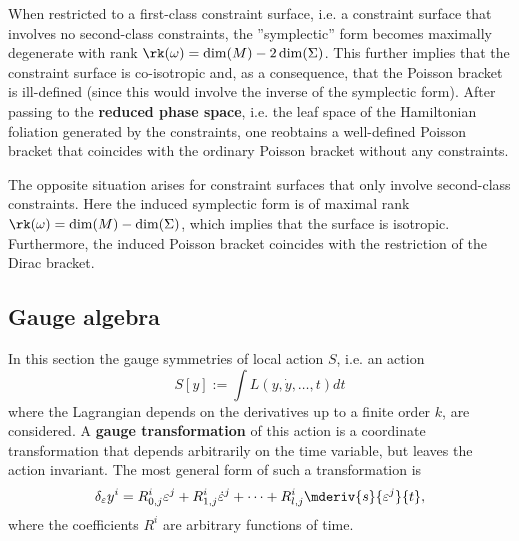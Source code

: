 
    \begin{property}
        When restricted to a first-class constraint surface, i.e. a constraint surface that involves no second-class constraints, the ''symplectic'' form becomes maximally degenerate with rank $\rk(\omega) = \dim(M) - 2\dim(\Sigma)$. This further implies that the constraint surface is co-isotropic and, as a consequence, that the Poisson bracket is ill-defined (since this would involve the inverse of the symplectic form). After passing to the \textbf{reduced phase space}, i.e. the leaf space of the Hamiltonian foliation generated by the constraints, one reobtains a well-defined Poisson bracket that coincides with the ordinary Poisson bracket without any constraints.

        The opposite situation arises for constraint surfaces that only involve second-class constraints. Here the induced symplectic form is of maximal rank $\rk(\omega) = \dim(M) - \dim(\Sigma)$, which implies that the surface is isotropic. Furthermore, the induced Poisson bracket coincides with the restriction of the Dirac bracket.
    \end{property}

\subsection{Gauge algebra}

    In this section the gauge symmetries of local action $S$, i.e. an action \[S[y] := \int L(y,\dot{y},\ldots,t) dt\] where the Lagrangian depends on the derivatives up to a finite order $k$, are considered. A \textbf{gauge transformation} of this action is a coordinate transformation that depends arbitrarily on the time variable, but leaves the action invariant. The most general form of such a transformation is
    \begin{gather}
        \label{lagrange:gauge_trasnformation}
        \delta_\varepsilon y^i = R^i_{0,j}\varepsilon^j + R^i_{1,j}\dot{\varepsilon}^j + \cdots + R^i_{l,j}\mderiv{s}{\varepsilon^j}{t},
    \end{gather}
    where the coefficients $R^i$ are arbitrary functions of time.

